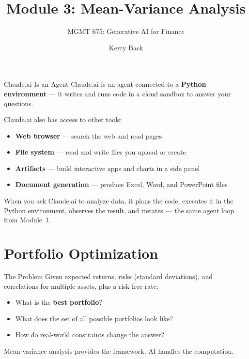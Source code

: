 \documentclass[aspectratio=169]{beamer}
\subtitle{MGMT 675: Generative AI for Finance}
\title{Module 3: Mean-Variance Analysis}
\author{Kerry Back}
\date{}
\begin{document}
\maketitle

\begin{frame}{Claude.ai Is an Agent}
Claude.ai is an agent connected to a \textbf{Python environment} --- it writes and runs code in a cloud sandbox to answer your questions.
\vspace{0.3cm}

Claude.ai also has access to other tools:
\begin{itemize}
  \item \textbf{Web browser} --- search the web and read pages
  \item \textbf{File system} --- read and write files you upload or create
  \item \textbf{Artifacts} --- build interactive apps and charts in a side panel
  \item \textbf{Document generation} --- produce Excel, Word, and PowerPoint files
\end{itemize}
\vspace{0.3cm}
When you ask Claude.ai to analyze data, it plans the code, executes it in the Python environment, observes the result, and iterates --- the same agent loop from Module~1.
\end{frame}

\section{Portfolio Optimization}

\begin{frame}{The Problem}
Given expected returns, risks (standard deviations), and correlations for multiple assets, plus a risk-free rate:

\begin{itemize}
  \item What is the \textbf{best portfolio}?
  \item What does the set of all possible portfolios look like?
  \item How do real-world constraints change the answer?
\end{itemize}

\vspace{0.3cm}
Mean-variance analysis provides the framework.  AI handles the computation.
\end{frame}
\end{document}
